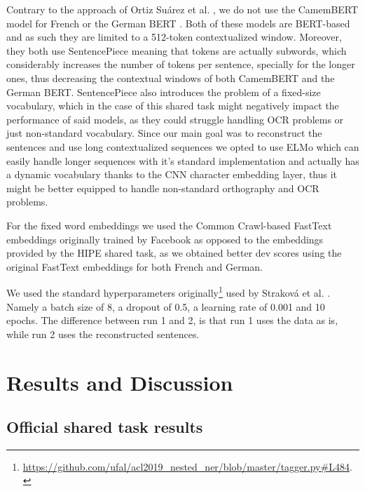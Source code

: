 Contrary to the approach of Ortiz Suárez et al. \cite{ortiz-suarez-etal-2020-establishing}, we do not use the CamemBERT model \cite{martin-etal-2020-camembert} for French or the German BERT \cite{chan-etal-2019-german}. Both of these models are BERT-based and as such they are limited to a 512-token contextualized window. Moreover, they both use SentencePiece \cite{kudo-richardson-2018-sentencepiece} meaning that tokens are actually subwords, which considerably increases the number of tokens per sentence, specially for the longer ones, thus decreasing the contextual windows of both CamemBERT and the German BERT. SentencePiece also introduces the problem of a fixed-size vocabulary, which in the case of this shared task might negatively impact the performance of said models, as they could struggle handling OCR problems or just non-standard vocabulary. Since our main goal was to reconstruct the sentences and use long contextualized sequences we opted to use ELMo which can easily handle longer sequences with it's standard implementation and actually has a dynamic vocabulary thanks to the CNN character embedding layer, thus it might be better equipped to handle non-standard orthography and OCR problems.

For the fixed word embeddings we used the Common Crawl-based FastText embeddings \cite{grave-etal-2018-learning} originally trained by Facebook as opposed to the embeddings provided by the HIPE shared task, as we obtained better dev scores using the original FastText embeddings for both French and German.

We used the standard hyperparameters originally\footnote{\url{https://github.com/ufal/acl2019_nested_ner/blob/master/tagger.py\#L484}.} used by Straková et al. \cite{strakova-etal-2019-neural}. Namely a batch size of 8, a dropout of 0.5, a learning rate of 0.001 and 10 epochs. The difference between run 1 and 2, is that run 1 uses the data as is, while run 2 uses the reconstructed sentences.

\section{Results and Discussion}
\label{sec:results}

\subsection{Official shared task results}


